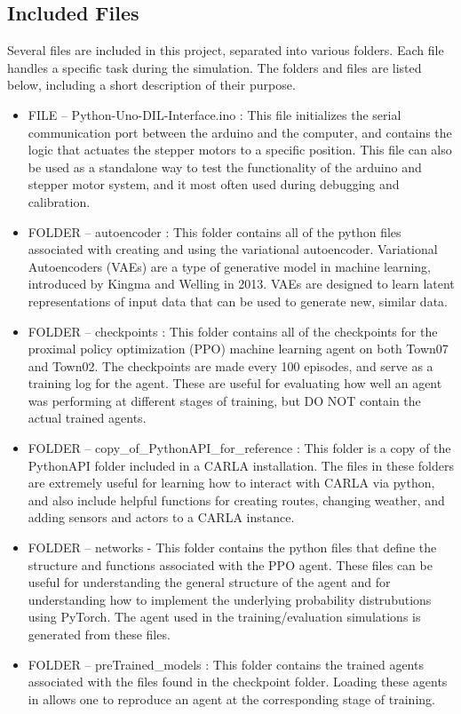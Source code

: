 \documentclass[12pt,oneside,letterpaper]{article}
\begin{document}
\subsection{Included Files}
Several files are included in this project, separated into various folders. Each file handles a specific task during the simulation. The folders and files are listed below, including a short description of their purpose.
\begin{itemize}
\item FILE -- Python-Uno-DIL-Interface.ino : This file initializes the serial communication port between the arduino and the computer, and contains the logic that actuates the stepper motors to a specific position. This file can also be used as a standalone way to test the functionality of the arduino and stepper motor system, and it most often used during debugging and calibration.
\item FOLDER -- autoencoder : This folder contains all of the python files associated with creating and using the variational autoencoder. Variational Autoencoders (VAEs) are a type of generative model in machine learning, introduced by Kingma and Welling in 2013. VAEs are designed to learn latent representations of input data that can be used to generate new, similar data.
\item FOLDER -- checkpoints : This folder contains all of the checkpoints for the proximal policy optimization (PPO) machine learning agent on both Town07 and Town02. The checkpoints are made every 100 episodes, and serve as a training log for the agent. These are useful for evaluating how well an agent was performing at different stages of training, but DO NOT contain the actual trained agents.
\item FOLDER -- copy\_of\_PythonAPI\_for\_reference : This folder is a copy of the PythonAPI folder included in a CARLA installation. The files in these folders are extremely useful for learning how to interact with CARLA via python, and also include helpful functions for creating routes, changing weather, and adding sensors and actors to a CARLA instance. 
\item FOLDER -- networks - This folder contains the python files that define the structure and functions associated with the PPO agent. These files can be useful for understanding the general structure of the agent and for understanding how to implement the underlying probability distrubutions using PyTorch. The agent used in the training/evaluation simulations is generated from these files.
\item FOLDER -- preTrained\_models : This folder contains the trained agents associated with the files found in the checkpoint folder. Loading these agents in allows one to reproduce an agent at the corresponding stage of training.

\end{itemize}
\end{document}
